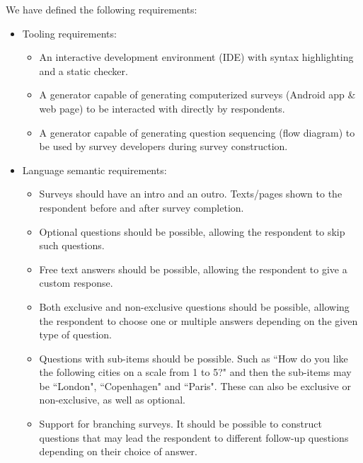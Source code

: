 \documentclass[runningheads,a4paper]{llncs}
\begin{document}
We have defined the following requirements:
\begin{itemize}
	\item Tooling requirements:
	\begin{itemize}
		\item An interactive development environment (IDE) with syntax highlighting and a static checker.
		\item A generator capable of generating computerized surveys (Android app \& web page) to be interacted with directly by respondents.
		\item A generator capable of generating question sequencing (flow diagram) to be used by survey developers during survey construction.
	\end{itemize}
	\item Language semantic requirements:
	\begin{itemize}
		\item Surveys should have an intro and an outro. Texts/pages shown to the respondent before and after survey completion.
		\item Optional questions should be possible, allowing the respondent to skip such questions.
		\item Free text answers should be possible, allowing the respondent to give a custom response.
		\item Both exclusive and non-exclusive questions should be possible, allowing the respondent to choose one or multiple answers depending on the given type of question.
		\item Questions with sub-items should be possible. Such as ``How do you like the following cities on a scale from 1 to 5?" and then the sub-items may be ``London", ``Copenhagen" and ``Paris". These can also be exclusive or non-exclusive, as well as optional.
		\item Support for branching surveys. It should be possible to construct questions that may lead the respondent to different follow-up questions depending on their choice of answer.
	\end{itemize}
\end{itemize}
\end{document}
